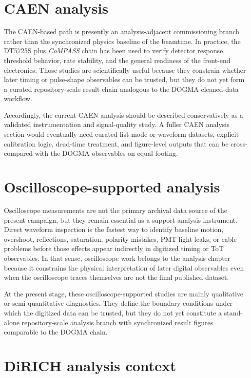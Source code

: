 \section{CAEN analysis}

The CAEN-based path is presently an analysis-adjacent commissioning branch rather than the synchronized physics baseline of the beamtime. In practice, the DT5725S plus \textit{CoMPASS} chain has been used to verify detector response, threshold behavior, rate stability, and the general readiness of the front-end electronics. Those studies are scientifically useful because they constrain whether later timing or pulse-shape observables can be trusted, but they do not yet form a curated repository-scale result chain analogous to the DOGMA cleaned-data workflow.

Accordingly, the current CAEN analysis should be described conservatively as a validated instrumentation and signal-quality study. A fuller CAEN analysis section would eventually need curated list-mode or waveform datasets, explicit calibration logic, dead-time treatment, and figure-level outputs that can be cross-compared with the DOGMA observables on equal footing.

\section{Oscilloscope-supported analysis}

Oscilloscope measurements are not the primary archival data source of the present campaign, but they remain essential as a support-analysis instrument. Direct waveform inspection is the fastest way to identify baseline motion, overshoot, reflections, saturation, polarity mistakes, PMT light leaks, or cable problems before those effects appear indirectly in digitized timing or ToT observables. In that sense, oscilloscope work belongs to the analysis chapter because it constrains the physical interpretation of later digital observables even when the oscilloscope traces themselves are not the final published dataset.

At the present stage, these oscilloscope-supported studies are mainly qualitative or semi-quantitative diagnostics. They define the boundary conditions under which the digitized data can be trusted, but they do not yet constitute a stand-alone repository-scale analysis branch with synchronized result figures comparable to the DOGMA chain.

\section{DiRICH analysis context}

